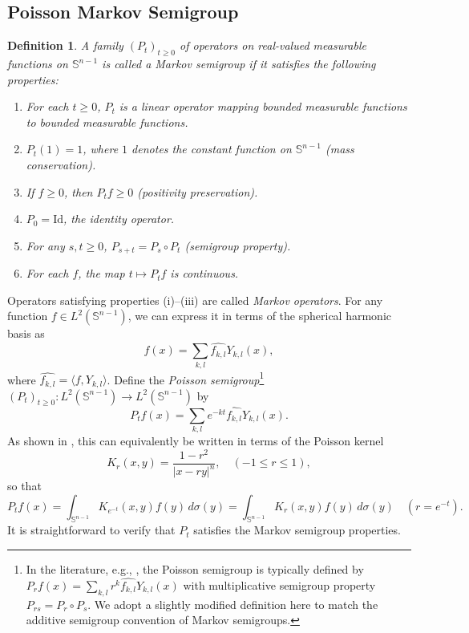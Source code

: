 \documentclass[11pt]{article}
\newtheorem{definition}[theorem]{Definition}
\newcommand{\sn}{{\mathbb{S}^{n-1} }}
\newcommand{\showcomment}[3]{\colorbox{#1}{\textcolor{white}{#2}}~{\textcolor{#1}{#3}}}
\newcommand{\venkat}[1]{\showcomment{MyDarkBlue}{Venkat}{#1}}
\begin{document}
\subsection{Poisson Markov Semigroup}
\begin{definition}
A family \( (P_t)_{t \geq 0} \) of operators on real-valued measurable functions on \( \sn \) is called a \emph{Markov semigroup} if it satisfies the following properties:
\begin{enumerate}[label=(\roman*)]
    \item For each \( t \geq 0 \), \( P_t \) is a linear operator mapping bounded measurable functions to bounded measurable functions.
    \item \( P_t(1) = 1 \), where \( 1 \) denotes the constant function on \( \sn \) (mass conservation).
    \item If \( f \geq 0 \), then \( P_t f \geq 0 \) (positivity preservation).
    \item \( P_0 = \mathrm{Id} \), the identity operator.
    \item For any \( s, t \geq 0 \), \( P_{s+t} = P_s \circ P_t \) (semigroup property).
    \item For each \( f \), the map \( t \mapsto P_t f \) is continuous.
\end{enumerate}
\end{definition}

Operators satisfying properties (i)–(iii) are called \emph{Markov operators}. For any function \( f \in L^2(\sn) \), we can express it in terms of the spherical harmonic basis as
\[
f(x) = \sum_{k,l} \widehat{f_{k,l}} Y_{k,l}(x),
\]
where \( \widehat{f_{k,l}} = \langle f, Y_{k,l} \rangle \). Define the \emph{Poisson semigroup}\footnote{In the literature, e.g., \cite{beckner1992sobolev}, the Poisson semigroup is typically defined by \( P_r f(x) = \sum_{k,l} r^k \widehat{f_{k,l}} Y_{k,l}(x) \) with multiplicative semigroup property \( P_{rs} = P_r \circ P_s \). We adopt a slightly modified definition here to match the additive semigroup convention of Markov semigroups.} \( (P_t)_{t \geq 0} : L^2(\sn) \to L^2(\sn) \) by
\[
P_t f(x) = \sum_{k,l} e^{-kt} \widehat{f_{k,l}} Y_{k,l}(x).
\]
As shown in \cite{beckner1992sobolev}, this can equivalently be written in terms of the Poisson kernel
\[
K_r(x, y) = \frac{1 - r^2}{|x - r y|^n}, \quad (-1 \leq r \leq 1),
\]
so that
\[
P_t f(x) = \int_{\sn} K_{e^{-t}}(x, y) f(y)\, d\sigma(y) = \int_{\sn} K_r(x, y) f(y)\, d\sigma(y) \quad (r = e^{-t}).
\]
It is straightforward to verify that \( P_t \) satisfies the Markov semigroup properties. 
\end{document}
